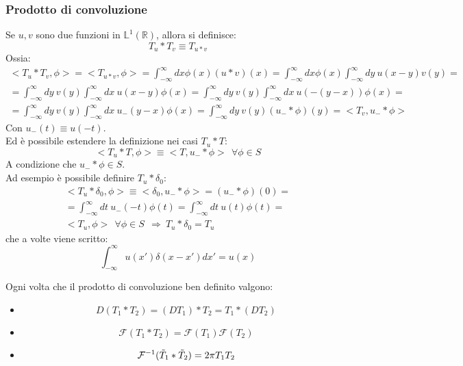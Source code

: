 \documentclass[twoside]{article}
\begin{document}
\subsubsection{Prodotto di convoluzione}
Se $u,v$ sono due funzioni in $\mathds{L}^1(\mathds{R})$, allora si definisce:
\begin{equation}
    T_u * T_v \equiv T_{u*v}
\end{equation}
Ossia:
\begin{equation}
    \begin{split}
        <T_u * T_v,\phi>=<T_{u*v},\phi>=\int_{-\infty}^{\infty}dx \phi(x) (u*v)(x)=
        \int_{-\infty}^{\infty}dx \phi(x)\int_{-\infty}^{\infty}dy \ u(x-y)v(y)= \\
        =\int_{-\infty}^{\infty}dy \ v(y)\int_{-\infty}^{\infty} dx \ u(x-y) \phi(x)= 
        \int_{-\infty}^{\infty}dy \ v(y) \int_{-\infty}^{\infty}dx \ u(-(y-x))\phi(x)=\\
        =\int_{-\infty}^{\infty}dy \ v(y)\int_{-\infty}^{\infty}dx \ u_- (y-x)\phi(x)
        =\int_{-\infty}^{\infty}dy \ v(y) (u_- * \phi) (y)=<T_v,u_-*\phi> 
    \end{split}
\end{equation}
Con $u_-(t)\equiv u(-t)$.
\\
Ed è possibile estendere la definizione nei casi $T_u * T$:
\begin{equation}
    <T_u*T,\phi>\equiv <T,u_-*\phi> \ \ \forall \phi \in S
\end{equation}
A condizione che $u_-*\phi \in S$.
\\
Ad esempio è possibile definire $T_u * \delta_0$:
\begin{equation}\begin{split}
    <T_u*\delta_0,\phi>\equiv <\delta_0,u_-*\phi>=(u_-*\phi)(0)=\\
    =\int_{-\infty}^{\infty}dt \ u_-(-t)\phi(t)=\int_{-\infty}^{\infty}dt \ u(t)\phi(t)= \\
<T_u,\phi> \ \ \forall \phi \in S \ \ \Rightarrow \ T_u*\delta_0=T_u
\end{split}\end{equation}
che a volte viene scritto:
\begin{equation}
    \int_{-\infty}^{\infty}u(x')\delta(x-x')dx'=u(x)
\end{equation}

Ogni volta che il prodotto di convoluzione ben definito valgono:
\begin{itemize}
    \item 
    \begin{equation}
        D(T_1*T_2)=(DT_1)*T_2=T_1*(DT_2)
    \end{equation}
    \item
    \begin{equation}
        \mathcal{F}(T_1*T_2)=\mathcal{F}(T_1)\mathcal{F}(T_2)
    \end{equation}
    \item
    \begin{equation}
        \mathcal{F}^{-1}(\Tilde{T}_1 * \Tilde{T}_2)=2\pi T_1 T_2
    \end{equation}
\end{itemize}
\end{document}
